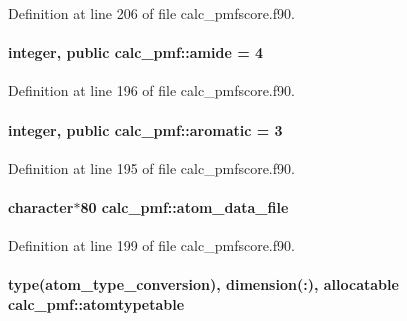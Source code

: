 Definition at line 206 of file calc\-\_\-pmfscore.\-f90.

\hypertarget{classcalc__pmf_aa79a18fe363aeaa2831ccf58dd4a7fcc}{
\paragraph[{amide}]{\setlength{\rightskip}{0pt plus 5cm}integer, public calc\-\_\-pmf\-::amide = 4}}\label{classcalc__pmf_aa79a18fe363aeaa2831ccf58dd4a7fcc}


Definition at line 196 of file calc\-\_\-pmfscore.\-f90.

\hypertarget{classcalc__pmf_ac99fa55cb2e0de3acc03adc92db25756}{
\paragraph[{aromatic}]{\setlength{\rightskip}{0pt plus 5cm}integer, public calc\-\_\-pmf\-::aromatic = 3}}\label{classcalc__pmf_ac99fa55cb2e0de3acc03adc92db25756}


Definition at line 195 of file calc\-\_\-pmfscore.\-f90.

\hypertarget{classcalc__pmf_a934737a3cd94904c0cd91912062ce21f}{
\paragraph[{atom\-\_\-data\-\_\-file}]{\setlength{\rightskip}{0pt plus 5cm}character$\ast$80 calc\-\_\-pmf\-::atom\-\_\-data\-\_\-file}}\label{classcalc__pmf_a934737a3cd94904c0cd91912062ce21f}


Definition at line 199 of file calc\-\_\-pmfscore.\-f90.

\hypertarget{classcalc__pmf_aaea67c47132371b0b4ee5dc74d16f778}{
\paragraph[{atomtypetable}]{\setlength{\rightskip}{0pt plus 5cm}type({\bf atom\-\_\-type\-\_\-conversion}), dimension(\-:), allocatable calc\-\_\-pmf\-::atomtypetable}}\label{classcalc__pmf_aaea67c47132371b0b4ee5dc74d16f778}



